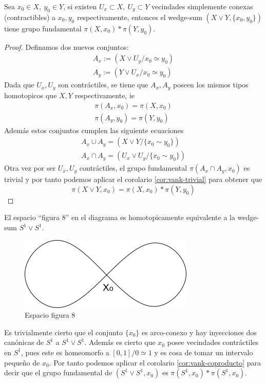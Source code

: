 \begin{corolario}
  \label{cor:vank-coproducto}
  Sea \(x_0 \in X, \ y_0 \in Y\), si existen \(U_x \subset X, \ U_y
  \subset Y\) vecindades simplemente conexas (contractibles) a \(x_0,
  y_0\) respectivamente, entonces el wedge-sum \((X \vee Y , \{x_0 ,
  y_0\})\) tiene grupo fundamental \(\pi (X, x_0) * \pi (Y, y_0)\).
\end{corolario}
\begin{proof}
  Definamos dos nuevos conjuntos:
  \begin{gather*}
    A_x := (X \vee U_y / {x_0 \simeq y_0}) \\
    A_y := (Y \vee U_x / {x_0 \simeq y_0})
  \end{gather*}
  Dada que \(U_x, U_y\) son contráctiles, se tiene que \(A_x, A_y\)
  poseen los mismos tipos homotopicos que \(X, Y\) respectivamente, ie
  \begin{gather*}
    \pi (A_x , x_0) = \pi (X, x_0) \\
    \pi (A_y , y_0) = \pi (Y, y_0)
  \end{gather*}
  Además estos conjuntos cumplen las siguiente ecuaciones
  \begin{gather*}
    A_x \cup A_y = (X \vee Y / \{ x_0 \sim y_0\}) \\
    A_x \cap A_y = (U_x \vee U_y / \{ x_0 \sim y_0\})
  \end{gather*}
  Otra vez por ser \(U_x, U_y\) contráctiles, el grupo fundamental
  \(\pi (A_x \cap A_y, x_0)\) es trivial y por tanto podemos aplicar el
  corolario \ref{cor:vank-trivial} para obtener que
  \[ \pi (X \vee Y, x_0) = \pi (X, x_0) * \pi (Y, y_0) \]
\end{proof}

\begin{ejemplo}
El espacio ``figura 8'' en el diagrama es homotopicamente equivalente a
la wedge-sum \(S^1 \vee S^1\).
  \begin{figure}[h]
    \centering \includegraphics[scale=0.5]{./imagenes/figura8.png}
    \caption*{Espacio figura 8}
  \end{figure}
  Es trivialmente cierto que el conjunto \(\{x_0\}\) es arco-conexo y
  hay inyecciones dos canónicas de \(S^1\) a \(S^1 \vee S^1\). Además es
  cierto que \(x_0\) posee vecindades contráctiles en \(S^1\), pues este
  es homeomorfo a \([0,1]/0 \simeq 1\) y es cosa de tomar un intervalo
  pequeño de \(x_0\). Por tanto podemos aplicar el corolario
  \ref{cor:vank-coproducto} para decir que el grupo fundamental de
  \(\left( S^1 \vee S^1 , x_0 \right) \) es \(\pi \left( S^1 , x_0 \right)
  * \pi \left( S^1 , x_0 \right) \).
\end{ejemplo}

